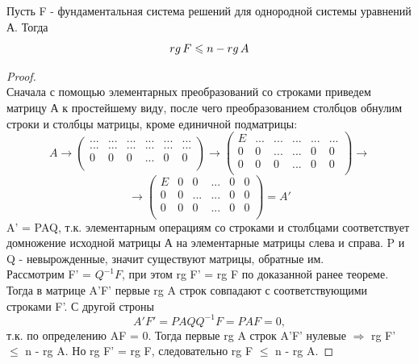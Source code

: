 \begin{theorem}
    Пусть F - фундаментальная система решений для однородной системы уравнений А. Тогда
    \[
    rg\thinspace F\leq n - rg\thinspace A
    \]
\end{theorem}
\begin{proof}
    \tab\\
    
    Сначала с помощью элементарных преобразований со строками приведем матрицу А к простейшему виду, после чего преобразованием столбцов обнулим строки и столбцы матрицы, кроме единичной подматрицы:
    \[
    A \longrightarrow
    \begin{pmatrix}
        ... & ... & ... & ... & ... & ... \\
        ... & ... & ... & ... & ... & ... \\
        0 & 0 & 0 & ... & 0 & 0 \\
    \end{pmatrix} \longrightarrow
    \begin{pmatrix}
        E & ... & ... & ... & ... & ...\\
        0 & 0 & ... & ... & 0 & 0 \\
        0 & 0 & 0 & ... & 0 & 0 \\
    \end{pmatrix} \longrightarrow
    \]
    \[
    \longrightarrow
    \begin{pmatrix}
        E & 0 & 0 & ... & 0 & 0\\
        0 & 0 & ... & ... & 0 & 0 \\
        0 & 0 & 0 & ... & 0 & 0 \\
    \end{pmatrix} = A'
    \]
    A' = PAQ, т.к. элементарным операциям со строками и столбцами соответствует домножение исходной матрицы А на элементарные матрицы слева и справа. P и Q - невырожденные, значит существуют матрицы, обратные им.\\

    Рассмотрим F' = $Q^{-1}F$, при этом rg F' = rg F по доказанной ранее теореме. Тогда в матрице A'F' первые rg A строк совпадают с соответствующими строками F'. С другой строны
    \[
    A'F' = PAQQ^{-1}F = PAF = 0,
    \]
    т.к. по определению AF = 0. Тогда первые rg A строк A'F' нулевые $\Longrightarrow$ rg F' $\leq$ n - rg A. Но rg F' = rg F, следовательно rg F $\leq$ n - rg A.
\end{proof}

